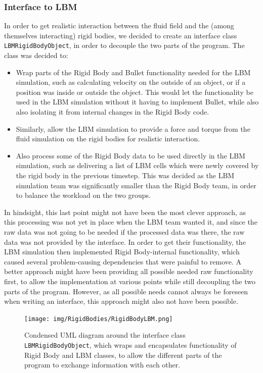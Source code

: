 \subsubsection{Interface to LBM}
In order to get realistic interaction between the fluid field and the (among themselves interacting) rigid bodies, we decided to create an interface class \texttt{LBMRigidBodyObject}, in order to decouple the two parts of the program. The class was decided to:
\begin{itemize}
\item Wrap parts of the Rigid Body and Bullet functionality needed for the LBM simulation, such as calculating velocity on the outside of an object, or if a position was inside or outside the object. This would let the functionality be used in the LBM simulation without it having to implement Bullet, while also also isolating it from internal changes in the Rigid Body code.
\item Similarly, allow the LBM simulation to provide a force and torque from the fluid simulation on the rigid bodies for realistic interaction.
\item Also process some of the Rigid Body data to be used directly in the LBM simulation, such as delivering a list of LBM cells which were newly covered by the rigid body in the previous timestep. This was decided as the LBM simulation team was significantly smaller than the Rigid Body team, in order to balance the workload on the two groups.
\end{itemize}
In hindsight, this last point might not have been the most clever approach, as this processing was not yet in place when the LBM team wanted it, and since the raw data was not going to be needed if the processed data was there, the raw data was not provided by the interface. In order to get their functionality, the LBM simulation then implemented Rigid Body-internal functionality, which caused several problem-causing dependencies that were painful to remove. A better approach might have been providing all possible needed raw functionality first, to allow the implementation at various points while still decoupling the two parts of the program. However, as all possible needs cannot always be foreseen when writing an interface, this approach might also not have been possible.

\begin{figure}[htb]
	\texttt{[image: img/RigidBodies/RigidBodyLBM.png]}
	\caption{Condensed UML diagram around the interface class \texttt{LBMRigidBodyObject}, which wraps and encapsulates functionality of Rigid Body and LBM classes, to allow the different parts of the program to exchange information with each other.}
	\label{fig:LBMRigUML}
\end{figure}

